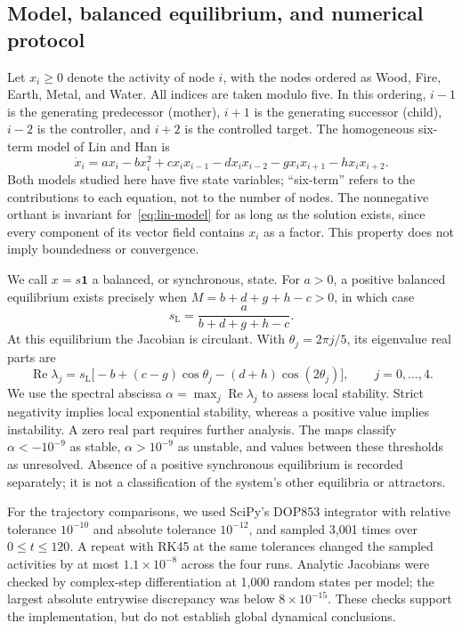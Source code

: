 \documentclass{article}
\begin{document}
\subsection{Model, balanced equilibrium, and numerical protocol}
Let $x_i\geq0$ denote the activity of node $i$, with the nodes ordered as
Wood, Fire, Earth, Metal, and Water. All indices are taken modulo five.
In this ordering, $i-1$ is the generating predecessor (mother), $i+1$ is
the generating successor (child), $i-2$ is the controller, and $i+2$ is
the controlled target. The homogeneous six-term model of Lin and Han
\cite{Lin2020} is
\begin{equation}
\dot x_i=a x_i-bx_i^2+c x_i x_{i-1}-d x_i x_{i-2}
               -g x_i x_{i+1}-h x_i x_{i+2}.
\label{eq:lin-model}
\end{equation}
Both models studied here have five state variables; ``six-term'' refers to
the contributions to each equation, not to the number of nodes.
The nonnegative orthant is invariant for~\eqref{eq:lin-model} for as long
as the solution exists, since every component of its vector field contains
$x_i$ as a factor. This property does not imply boundedness or convergence.

We call $x=s\mathbf{1}$ a balanced, or synchronous, state. For $a>0$,
a positive balanced equilibrium exists precisely when
$M=b+d+g+h-c>0$, in which case
\begin{equation}
 s_{\mathrm L}=\frac{a}{b+d+g+h-c}.
 \label{eq:lin-balance}
\end{equation}
At this equilibrium the Jacobian is circulant. With
$\theta_j=2\pi j/5$, its eigenvalue real parts are
\begin{equation}
 \operatorname{Re}\lambda_j
 =s_{\mathrm L}\bigl[-b+(c-g)\cos\theta_j
                         -(d+h)\cos(2\theta_j)\bigr],
 \qquad j=0,\ldots,4.
 \label{eq:lin-spectrum}
\end{equation}
We use the spectral abscissa
$\alpha=\max_j\operatorname{Re}\lambda_j$ to assess local stability.
Strict negativity implies local exponential stability, whereas a positive
value implies instability. A zero real part requires further analysis.
The maps classify $\alpha<-10^{-9}$ as stable, $\alpha>10^{-9}$ as
unstable, and values between these thresholds as unresolved. Absence of a
positive synchronous equilibrium is recorded separately; it is not a
classification of the system's other equilibria or attractors.

For the trajectory comparisons, we used SciPy's DOP853 integrator with
relative tolerance $10^{-10}$ and absolute tolerance $10^{-12}$, and
sampled 3,001 times over $0\leq t\leq120$. A repeat with RK45 at the same
tolerances changed the sampled activities by at most $1.1\times10^{-8}$
across the four runs. Analytic Jacobians were checked by complex-step
differentiation at 1,000 random states per model; the largest absolute
entrywise discrepancy was below $8\times10^{-15}$. These checks support
the implementation, but do not establish global dynamical conclusions.
\end{document}
